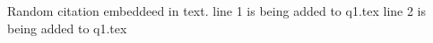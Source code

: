 \documentclass{article}
\begin{document}
Random citation \cite{DUMMY:1} embeddeed in text.
line 1 is being added to q1.tex
line 2 is being added to q1.tex

\newpage

 

\end{document}
